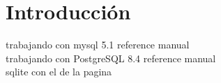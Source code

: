 \chapter{Introducción}

trabajando con mysql 5.1 reference manual\\

trabajando con PostgreSQL 8.4 reference manual\\

sqlite con el de la pagina\\
